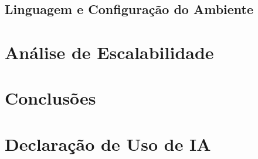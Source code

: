 \documentclass[11pt]{article}
\begin{document}
\subsection{Linguagem e Configuração do Ambiente}

\section{Análise de Escalabilidade}

\section{Conclusões}

\section*{Declaração de Uso de IA}
\end{document}
